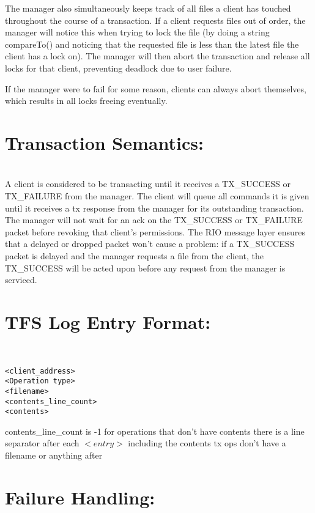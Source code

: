 \documentclass[11pt]{article}
\begin{document}
The manager also simultaneously keeps track of all files a client has touched throughout the course of a transaction. If a client requests files out of order, the manager will notice this when trying to lock the file (by doing a string compareTo() and noticing that the requested file is less than the latest file the client has a lock on). The manager will then abort the transaction and release all locks for that client, preventing deadlock due to user failure.

If the manager were to fail for some reason, clients can always abort themselves, which results in all locks freeing eventually.  \\

\section{Transaction Semantics:} \\

A client is considered to be transacting until it receives a TX\_SUCCESS or TX\_FAILURE from the manager. 
The client will queue all commands it is given until it receives a tx response from the manager for its outstanding transaction. \\
 
The manager will not wait for an ack on the TX\_SUCCESS or TX\_FAILURE packet before revoking that client's permissions. The RIO message layer ensures that a delayed or dropped packet won't cause a problem: if a TX\_SUCCESS packet is delayed and the manager requests a file from the client, the TX\_SUCCESS will be acted upon before any request from the manager is serviced. \\

\section{TFS Log Entry Format:} \\

\begin{verbatim}
<client_address>
<Operation type>
<filename>
<contents_line_count>
<contents>
\end{verbatim}

contents\_line\_count is -1 for operations that don't have contents
there is a line separator after each $<entry>$ including the contents
tx ops don't have a filename or anything after \\

\section{Failure Handling:} \\
\end{document}
